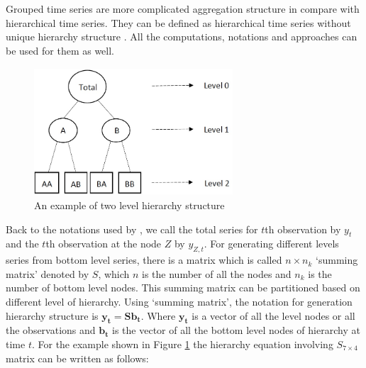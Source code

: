 \documentclass[11pt,a4paper,]{article}
\begin{document}
Grouped time series are more complicated aggregation structure in
compare with hierarchical time series. They can be defined as
hierarchical time series without unique hierarchy structure
\autocite{hyndman2015hts}. All the computations, notations and
approaches can be used for them as well.

\begin{figure}

{\centering \includegraphics[width=280px,height=180px]{Paper-Figures/hierarchical_example} 

}

\caption{An example of two level hierarchy structure}\label{fig:hierarchicalexample}
\end{figure}

Back to the notations used by \textcite{hyndman2016fast}, we call the
total series for \(t\)th observation by \(y_t\) and the \(t\)th
observation at the node \(Z\) by \(y_{Z,t}\). For generating different
levels series from bottom level series, there is a matrix which is
called \(n\times n_k\) `summing matrix' denoted by \(S\), which \(n\) is
the number of all the nodes and \(n_k\) is the number of bottom level
nodes. This summing matrix can be partitioned based on different level
of hierarchy. Using `summing matrix', the notation for generation
hierarchy structure is \(\mathbf{y_t}=\mathbf{Sb_t}\). Where
\(\mathbf{y_t}\) is a vector of all the level nodes or all the
observations and \(\mathbf{b_t}\) is the vector of all the bottom level
nodes of hierarchy at time \(t\). For the example shown in Figure
\ref{fig:hierarchicalexample} the hierarchy equation involving
\(S_{7\times 4}\) matrix can be written as follows:
\end{document}
